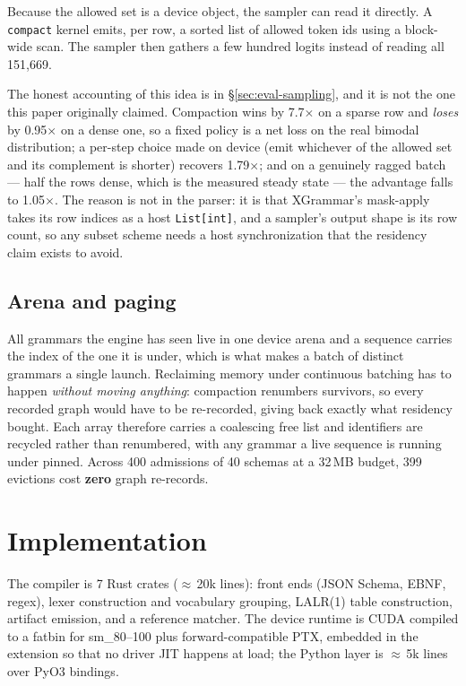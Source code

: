 \documentclass{article}
\begin{document}
Because the allowed set is a device object, the sampler can read it directly.
A \texttt{compact} kernel emits, per row, a sorted list of allowed token ids
using a block-wide scan. The sampler then gathers a few hundred logits instead
of reading all 151{,}669.

The honest accounting of this idea is in \S\ref{sec:eval-sampling}, and it is
not the one this paper originally claimed. Compaction wins by 7.7$\times$ on a
sparse row and \emph{loses} by 0.95$\times$ on a dense one, so a fixed policy is
a net loss on the real bimodal distribution; a per-step choice made on device
(emit whichever of the allowed set and its complement is shorter) recovers
1.79$\times$; and on a genuinely ragged batch --- half the rows dense, which is
the measured steady state --- the advantage falls to 1.05$\times$. The reason is
not in the parser: it is that XGrammar's mask-apply takes its row indices as a
host \texttt{List[int]}, and a sampler's output shape is its row count, so any
subset scheme needs a host synchronization that the residency claim exists to
avoid.

\subsection{Arena and paging}

All grammars the engine has seen live in one device arena and a sequence
carries the index of the one it is under, which is what makes a batch of
distinct grammars a single launch. Reclaiming memory under continuous batching
has to happen \emph{without moving anything}: compaction renumbers survivors,
so every recorded graph would have to be re-recorded, giving back exactly what
residency bought. Each array therefore carries a coalescing free list and
identifiers are recycled rather than renumbered, with any grammar a live
sequence is running under pinned. Across 400 admissions of 40 schemas at a
32\,MB budget, 399 evictions cost \textbf{zero} graph re-records.

\section{Implementation}
\label{sec:impl}

The compiler is 7 Rust crates ($\approx$\,20k lines): front ends (JSON Schema,
EBNF, regex), lexer construction and vocabulary grouping, LALR(1) table
construction, artifact emission, and a reference matcher. The device runtime is
CUDA compiled to a fatbin for sm\_80--100 plus forward-compatible PTX, embedded
in the extension so that no driver JIT happens at load; the Python layer is
$\approx$\,5k lines over PyO3 bindings.
\end{document}
